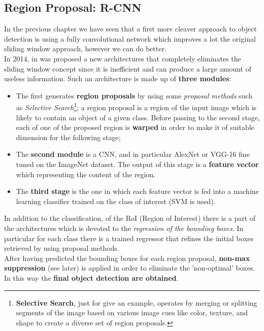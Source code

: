 \subsection{Region Proposal: R-CNN}
In the previous chapter we have seen that a first more cleaver approach to object detection is using a fully convolutional network which improves a lot the original sliding window approach, however we can do better. \\
In 2014, in \cite{girshick2014rich} was proposed a new architectures that completely eliminates the sliding window concept since it is inefficient and can produce a large amount of useless information. Such an architecture is made up of \textbf{three modules}: 
\begin{itemize}
    \item The first generates \textbf{region proposals} by using some \textit{proposal methods} such as \textit{Selective Search}\footnote{
        \textbf{Selective Search}, just for give an example, operates by merging or splitting segments of the image based on various image cues like color, texture, and shape to create a diverse set of region proposals.}; a region proposal is a region of the input image which is likely to contain an object of a given class. Before passing to the second stage, each of one of the proposed region is \textbf{warped} in order to make it of suitable dimension for the following stage;  
    \item The \textbf{second module} is a CNN, and in particular AlexNet or VGG-16 fine tuned on the ImageNet dataset. The output of this stage is a \textbf{feature vector} which representing the content of the region.
    \item The \textbf{third stage} is the one in which each feature vector is fed into a machine learning classifier trained on the class of interest (SVM is used).
\end{itemize}

In addition to the classification, of the RoI (Region of Interest) there is a part of the architectures which is devoted to the \textit{regression of the bounding boxes}. In particular for each class there is a trained regressor that refines the initial boxes retrieved by using proposal methods.\\

After having predicted the bounding boxes for each region proposal, \textbf{non-max suppression} (see later) is applied in order to eliminate the 'non-optimal' boxes. In this way the \textbf{final object detection are obtained}.

